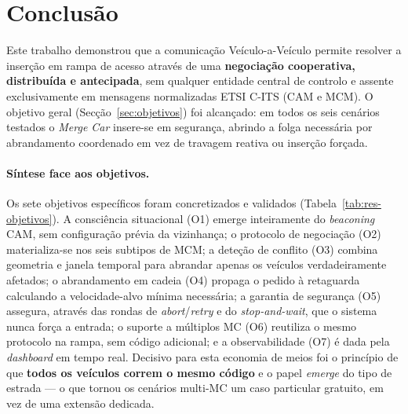 \documentclass[11pt,a4paper]{article}
\begin{document}
\section{Conclusão}
\label{sec:conclusao}

Este trabalho demonstrou que a comunicação Veículo-a-Veículo permite resolver a inserção
em rampa de acesso através de uma \textbf{negociação cooperativa, distribuída e
antecipada}, sem qualquer entidade central de controlo e assente exclusivamente em
mensagens normalizadas ETSI C-ITS (CAM e MCM). O objetivo geral
(Secção~\ref{sec:objetivos}) foi alcançado: em todos os seis cenários testados o
\emph{Merge Car} insere-se em segurança, abrindo a folga necessária por abrandamento
coordenado em vez de travagem reativa ou inserção forçada.

\paragraph{Síntese face aos objetivos.} Os sete objetivos específicos foram concretizados
e validados (Tabela~\ref{tab:res-objetivos}). A consciência situacional (O1) emerge
inteiramente do \emph{beaconing} CAM, sem configuração prévia da vizinhança; o protocolo
de negociação (O2) materializa-se nos seis subtipos de MCM; a deteção de conflito (O3)
combina geometria e janela temporal para abrandar apenas os veículos verdadeiramente
afetados; o abrandamento em cadeia (O4) propaga o pedido à retaguarda calculando a
velocidade-alvo mínima necessária; a garantia de segurança (O5) assegura, através das
rondas de \emph{abort}/\emph{retry} e do \emph{stop-and-wait}, que o sistema nunca força
a entrada; o suporte a múltiplos MC (O6) reutiliza o mesmo protocolo na rampa, sem código
adicional; e a observabilidade (O7) é dada pela \emph{dashboard} em tempo real. Decisivo
para esta economia de meios foi o princípio de que \textbf{todos os veículos correm o
mesmo código} e o papel \emph{emerge} do tipo de estrada --- o que tornou os cenários
multi-MC um caso particular gratuito, em vez de uma extensão dedicada.
\end{document}
